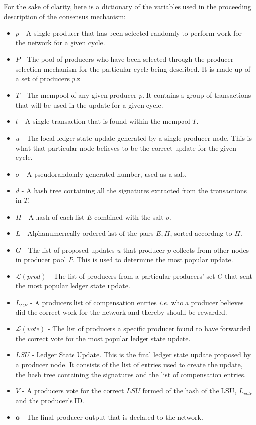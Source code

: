 For the sake of clarity, here is a dictionary of the variables used in the proceeding description of the consensus mechanism:

\begin{itemize}

\item $p$ - A single producer that has been selected randomly to perform work for the network for a given cycle.
\item $P$ - The pool of producers who have been selected through the producer selection mechanism for the particular cycle being described. It is made up of a set of producers $p$.z
\item $T$ - The mempool of any given producer $p$. It contains a group of transactions that will be used in the update for a given cycle.
\item $t$ - A single transaction that is found within the mempool $T$.
\item $u$ - The local ledger state update generated by a single producer node. This is what that particular node believes to be the correct update for the given cycle.
\item $\sigma$ - A pseudorandomly generated number, used as a salt.
\item $d$ - A hash tree containing all the signatures extracted from the transactions in $T$.
\item $H$ - A hash of each list $E$ combined with the salt $\sigma$.
\item $L$ - Alphanumerically ordered list of the pairs $E,H$, sorted according to $H$.
\item $G$ - The list of proposed updates $u$ that producer $p$ collects from other nodes in producer pool $P$. This is used to determine the most popular update.
\item $\mathcal{L}(prod)$ - The list of producers from a particular producers' set $G$ that sent the most popular ledger state update.
\item $L_{CE}$ - A producers list of compensation entries \textit{i.e.} who a producer believes did the correct work for the network and thereby should be rewarded.
\item $\mathcal{L}(vote)$ - The list of producers a specific producer found to have forwarded the correct vote for the most popular ledger state update.
\item $LSU$ - Ledger State Update. This is the final ledger state update proposed by a producer node. It consists of the list of entries used to create the update, the hash tree containing the signatures and the list of compensation entries.
\item $V$ - A producers vote for the correct $LSU$ formed of the hash of the LSU, $L_{vote}$ and the producer's ID.
\item $\mathbf{o}$ - The final producer output that is declared to the network.
\end{itemize}

